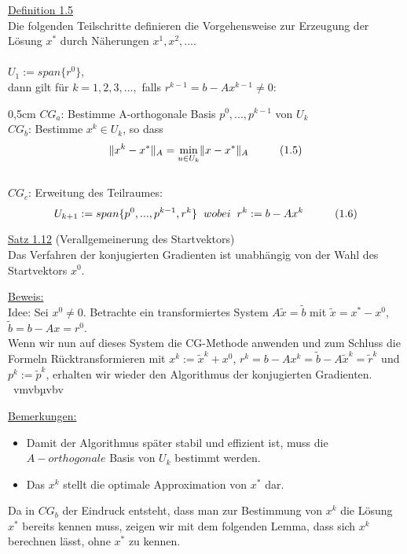 \documentclass[a4paper]{letter}
\begin{document}
\underline{Definition 1.5}
\\Die folgenden Teilschritte definieren die Vorgehensweise zur Erzeugung der L\"osung $x^{*}$ durch N\"aherungen $x^{1}, x^{2},...$.
\\\\$U_{1} := span\{r^{0}\}$,
\\dann gilt f\"ur $k = 1,2,3,...,$ falls $r^{k-1} = b - Ax^{k-1} \ne 0$:
\begin{addmargin}[0,5cm]{0,5cm}
$CG_{a}$: Bestimme A-orthogonale Basis $p^{0},...,p^{k-1}$ von $U_{k}$
\\$CG_{b}$: Bestimme $x^{k} \in U_{k}$, so dass
$$\|x^{k} - x^{*}\|_{A} = \underset{u \in U_{k}}{\min} \|x - x^{*}\|_{A} \hspace{10mm} (1.5)$$
\\$CG_{c}$: Erweitung des Teilraumes:
$$U_{k+1} := span\{p^{0},...,p^{k-1},r^{k}\} \hspace{2mm} wobei \hspace{2mm} r^{k} := b - Ax^{k} \hspace{10mm} (1.6)$$
\end{addmargin}

\underline{Satz 1.12} (Verallgemeinerung des Startvektors)
\\Das Verfahren der konjugierten Gradienten ist unabh\"angig von der Wahl des Startvektors $x^{0}$.

\underline{Beweis:}
\\Idee: Sei $x^{0} \ne 0$. Betrachte ein transformiertes System $A\tilde x = \tilde b$ mit $\tilde x = x^{*} - x^{0}$, $\tilde b = b - Ax = r^{0}$.
\\Wenn wir nun auf dieses System die CG-Methode anwenden und zum Schluss die Formeln R\"ucktransformieren mit $x^{k} := \tilde x^{k} + x^{0}$, $r^{k} = b- Ax^{k} = \tilde b - A\tilde x^{k} = \tilde r^{k}$ und $p^{k} := \tilde p^{k}$, erhalten wir wieder den Algorithmus der konjugierten Gradienten.       ~vmvbµvbv               

\underline{Bemerkungen:}
\begin{itemize}
	\item Damit der Algorithmus sp\"ater stabil und effizient ist, muss die $A-orthogonale$ Basis von $U_{k}$ bestimmt werden.
	\item Das $x^{k}$ stellt die optimale Approximation von $x^{*}$ dar.
\end{itemize}

Da in $CG_{b}$ der Eindruck entsteht, dass man zur Bestimmung von $x^{k}$ die L\"osung $x^{*}$ bereits kennen muss, zeigen wir mit dem folgenden Lemma, dass sich $x^{k}$ berechnen l\"asst, ohne $x^{*}$ zu kennen.
\end{document}
